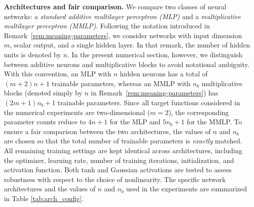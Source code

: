 \documentclass[11pt,reqno]{amsart}
\numberwithin{equation}{section}
\theoremstyle{remark}
\theoremstyle{definition}
\newcommand{\emphTitle}[1]{\medskip\noindent\textbf{#1.}\quad}
\begin{document}
\emphTitle{Architectures and fair comparison}
We compare two classes of neural networks: a \emph{standard additive multilayer perceptron (MLP)} and a \emph{multiplicative multilayer perceptron (MMLP)}.
Following the notation introduced in Remark~\ref{rem:meaning-parameters}, we consider networks with input dimension \(m\), scalar output, and a single hidden layer. In that remark, the number of hidden units is denoted by \(n\). In the present numerical section, however, we distinguish between additive neurons and multiplicative blocks to avoid notational ambiguity.
With this convention, an MLP with \(n\) hidden neurons has a total of \((m+2)n+1\) trainable parameters, whereas an MMLP with \(n_b\) multiplicative blocks (denoted simply by \(n\) in Remark~\ref{rem:meaning-parameters}) has \((2m+1)n_b+1\) trainable parameters. Since all target functions considered in the numerical experiments are two-dimensional (\(m=2\)), the corresponding parameter counts reduce to \(4n+1\) for the MLP and \(5n_b+1\) for the MMLP.
To ensure a fair comparison between the two architectures, the values of \(n\) and \(n_b\) are chosen so that the total number of trainable parameters is {\it{exactly}} matched. All remaining training settings are kept identical across architectures, including the optimizer, learning rate, number of training iterations, initialization, and activation function. Both tanh and Gaussian activations are tested to assess robustness with respect to the choice of nonlinearity.
The specific network architectures and the values of \(n\) and \(n_b\) used in the experiments are summarized in Table \ref{tab:arch_config}.
\end{document}
